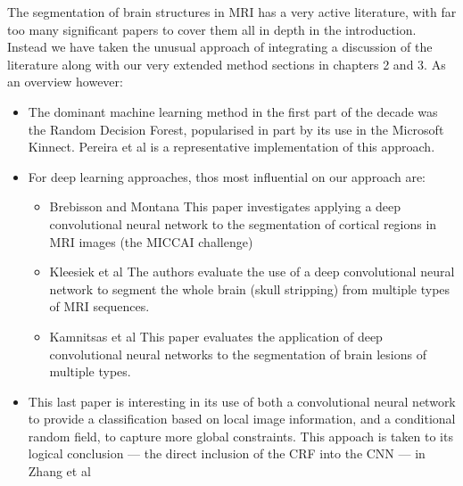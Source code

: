 \documentclass[msc]{infthesis}
\begin{document}
The segmentation of brain structures in MRI has a very active literature,
with far too many significant papers to cover them all in depth in the introduction.  Instead
we have taken the unusual approach of integrating a discussion of the literature along with
our very extended method sections in chapters 2 and 3.  As an overview however:
\begin{itemize}
\item The dominant machine learning
  method in the first part of the decade was the Random Decision Forest,
  popularised in part by its
  use in the Microsoft Kinnect.  Pereira et al 
  \cite{Pereira:automatic-brain-tissue-segmentation-using-RDFs} is a representative
  implementation of this approach.
\item For deep learning approaches, thos most influential on our approach are:
  \begin{itemize}
  \item Brebisson and Montana
    \cite{Brebisson:deep-NN-anatomical-brain-segmentation} This paper
    investigates applying a deep convolutional neural network to the
    segmentation of cortical regions in MRI images (the MICCAI
    challenge)
  \item Kleesiek et al \cite{Kleesiek:deep-MRI-brain-extraction} The
    authors evaluate the use of a deep convolutional neural network to
    segment the whole brain (skull stripping) from multiple types of
    MRI sequences.
  \item Kamnitsas et al \cite{Kamnitsas:multi-scale-3D-CNN-with-CRF}
    This paper evaluates the application of deep convolutional neural
    networks to the segmentation of brain lesions of multiple types.
  \end{itemize}
\item This last paper is interesting in its use of both a convolutional
  neural network to provide a classification based on local image 
  information, and a conditional random field, to capture more global
  constraints.  This appoach is taken to its logical conclusion --- the
  direct inclusion of the CRF into the CNN --- in  
  Zhang et al \cite{Zhang:deep-CNNs-multi-modality-brain-segmentation}
\end{itemize}



\newpage
\end{document}

